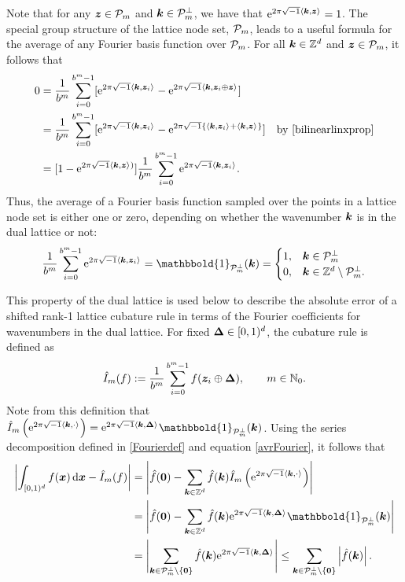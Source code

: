 \documentclass[graybox]{svmult}
\newcommand{\Z}{\mathbb{Z}} %
\newcommand{\N}{\mathbb{N}} %
\newcommand{\bszero}{\boldsymbol{0}} %
\newcommand{\bsx}{\boldsymbol{x}}    %
\newcommand{\bsz}{\boldsymbol{z}}    %
\newcommand{\bsDelta}{\boldsymbol{\Delta}}    %
\newcommand{\ind}{\mathbbold{1}}
\begin{document}
Note that for any $\bsz\in\cp_m$ and $\boldsymbol{k}\in\mathcal{P}_m^\perp$, we have that $\E^{2 \pi \sqrt{-1} \ip{\bsk}{\bsz}}=1$. The special group structure of the  lattice node set, $\mathcal{P}_m$, leads to a useful formula for the average of any Fourier basis function over $\mathcal{P}_m$. For all $\bsk \in \Z^d$ and $\bsz \in \cp_m$, it follows that
\begin{align*}
\nonumber
0 &
= \frac{1}{b^m} \sum_{i=0}^{b^m-1} [\E^{2 \pi \sqrt{-1} \ip{\bsk}{\bsz_i}} - \E^{2 \pi \sqrt{-1} \ip{\bsk}{\bsz_i \oplus \bsz}}]\\
\nonumber
& = \frac{1}{b^m} \sum_{i=0}^{b^m-1} [\E^{2 \pi \sqrt{-1} \ip{\bsk}{\bsz_i}} - \E^{2 \pi \sqrt{-1} \{\ip{\bsk}{\bsz_i}+\ip{\bsk}{\bsz}\}}] \quad \text{by } \eqref{bilinearlinxprop}\\
\label{sumeq}
& = [1 - \E^{2 \pi \sqrt{-1} \ip{\bsk}{\bsz})}] \frac{1}{b^m} \sum_{i=0}^{b^m-1} \E^{2 \pi \sqrt{-1} \ip{\bsk}{\bsz_i}}.
\end{align*}
Thus, the average of a Fourier basis function sampled over the points in a lattice node set is either one or zero, depending on whether the wavenumber $\boldsymbol{k}$ is in the dual lattice or not:
\begin{equation}\label{avrFourier}
\frac{1}{b^m} \sum_{i=0}^{b^m-1} \E^{2 \pi \sqrt{-1} \ip{\bsk}{\bsz_i}} = \ind_{\cp_m^{\perp}}(\bsk) = \begin{cases} 1 , & \bsk \in \cp_m^{\perp}\\
 0,  & \bsk \in \Z^d \setminus \cp_m^{\perp}.
 \end{cases}
\end{equation}

This property of the dual lattice is used below to describe the absolute error of a shifted rank-1 lattice cubature rule in terms of the Fourier coefficients for wavenumbers in the dual lattice. For fixed $\bsDelta \in \cube$, the cubature rule is defined as
\begin{equation} \label{cubaturedef}
\hI_m(f) := \frac{1}{b^m} \sum_{i=0}^{b^m-1} f(\bsz_i \oplus\bsDelta),  \qquad  m \in \N_0.
\end{equation}
Note from this definition that $\hI_m\left(\E^{2 \pi \sqrt{-1} \ip{\bsk}{\cdot}}\right)= \E^{2 \pi \sqrt{-1} \ip{\bsk}{\bsDelta}}\ind_{\cp_m^{\perp}}(\bsk)$. Using the series decomposition defined in \eqref{Fourierdef} and equation \eqref{avrFourier}, it follows that
\begin{align}
\nonumber
\biggabs{ \int_{\cube} f(\bsx) \, \D \bsx - \hI_m(f)} 
& = \Biggabs {\hf(\bszero) - \sum_{\bsk \in \Z^d} \hf(\bsk) \hI_m\left(\E^{2 \pi \sqrt{-1} \ip{\bsk}{\cdot}}\right)} \\
\nonumber
& = \Biggabs {\hf(\bszero) - \sum_{\bsk \in \Z^d} \hf(\bsk) \E^{2 \pi \sqrt{-1} \ip{\bsk}{\bsDelta}} \ind_{\cp_m^{\perp}}(\bsk)  } \\ 
& = \Biggabs {\sum_{\bsk \in \cp_m^{\perp}\setminus \{\bszero\} } \hf(\bsk)  \E^{2 \pi \sqrt{-1} \ip{\bsk}{\bsDelta}} } \le \sum_{\bsk \in \cp_m^{\perp}\setminus \{\bszero\} } \abs{\hf(\bsk)}. \label{err1}
\end{align}
\end{document}
